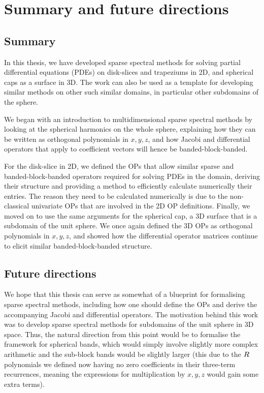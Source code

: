 

\chapter{Summary and future directions}

\section{Summary}

In this thesis, we have developed sparse spectral methods for solving partial differential equations (PDEs) on disk-slices and trapeziums in 2D, and spherical caps as a surface in 3D. The work can also be used as a template for developing similar methods on other such similar domains, in particular other subdomains of the sphere.

We began with an introduction to multidimensional sparse spectral methods by looking at the spherical harmonics on the whole sphere, explaining how they can be written as orthogonal polynomials in $x,y,z$, and how Jacobi and differential operators that apply to coefficient vectors will hence be banded-block-banded.

For the disk-slice in 2D, we defined the OPs that allow similar sparse and banded-block-banded operators required for solving PDEs in the domain, deriving their structure and providing a method to efficiently calculate numerically their entries. The reason they need to be calculated numerically is due to the non-classical univariate OPs that are involved in the 2D OP definitions. Finally, we moved on to use the same arguments for the spherical cap, a 3D surface that is a subdomain of the unit sphere. We once again defined the 3D OPs as orthogonal polynomials in $x,y,z$, and showed how the differential operator matrices continue to elicit similar banded-block-banded structure.


\section{Future directions}

We hope that this thesis can serve as somewhat of a blueprint for formalising sparse spectral methods, including how one should define the OPs and derive the accompanying Jacobi and differential operators. The motivation behind this work was to develop sparse spectral methods for subdomains of the unit sphere in 3D space. Thus, the natural direction from this point would be to formalise the framework for spherical bands, which would simply involve slightly more complex arithmetic and the sub-block bands would be slightly larger (this due to the $R$ polynomials we defined now having no zero coefficients in their three-term recurrences, meaning the expressions for multiplication by $x,y,z$ would gain some extra terms).


